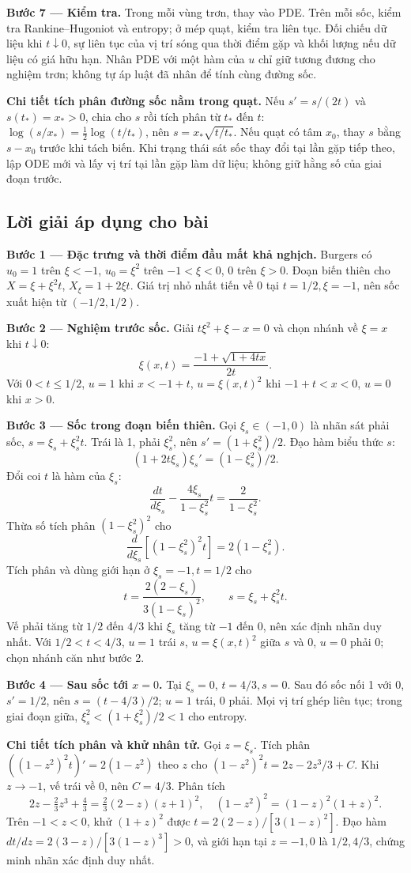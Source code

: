 \documentclass[10pt,a4paper]{article}
\begin{document}
\textbf{Bước 7 — Kiểm tra.} Trong mỗi vùng trơn, thay vào PDE. Trên mỗi sốc, kiểm tra Rankine–Hugoniot và entropy; ở mép quạt, kiểm tra liên tục. Đối chiếu dữ liệu khi $t\downarrow0$, sự liên tục của vị trí sóng qua thời điểm gặp và khối lượng nếu dữ liệu có giá hữu hạn. Nhân PDE với một hàm của $u$ chỉ giữ tương đương cho nghiệm trơn; không tự áp luật đã nhân để tính cùng đường sốc.

\textbf{Chi tiết tích phân đường sốc nằm trong quạt.} Nếu $s'=s/(2t)$ và $s(t_*)=x_*>0$, chia cho $s$ rồi tích phân từ $t_*$ đến $t$: $\log(s/x_*)=\frac12\log(t/t_*)$, nên $s=x_*\sqrt{t/t_*}$. Nếu quạt có tâm $x_0$, thay $s$ bằng $s-x_0$ trước khi tách biến. Khi trạng thái sát sốc thay đổi tại lần gặp tiếp theo, lập ODE mới và lấy vị trí tại lần gặp làm dữ liệu; không giữ hằng số của giai đoạn trước.
\subsection*{Lời giải áp dụng cho bài}
\textbf{Bước 1 — Đặc trưng và thời điểm đầu mất khả nghịch.} Burgers có $u_0=1$ trên $\xi<-1$, $u_0=\xi^2$ trên $-1<\xi<0$, 0 trên $\xi>0$. Đoạn biến thiên cho $X=\xi+\xi^2t$, $X_\xi=1+2\xi t$. Giá trị nhỏ nhất tiến về 0 tại $t=1/2,\xi=-1$, nên sốc xuất hiện từ $(-1/2,1/2)$.

\textbf{Bước 2 — Nghiệm trước sốc.} Giải $t\xi^2+\xi-x=0$ và chọn nhánh về $\xi=x$ khi $t\downarrow0$:
\[\xi(x,t)=\frac{-1+\sqrt{1+4tx}}{2t}.\]
Với $0<t\le1/2$, $u=1$ khi $x<-1+t$, $u=\xi(x,t)^2$ khi $-1+t<x<0$, $u=0$ khi $x>0$.

\textbf{Bước 3 — Sốc trong đoạn biến thiên.} Gọi $\xi_s\in(-1,0)$ là nhãn sát phải sốc, $s=\xi_s+\xi_s^2t$. Trái là 1, phải $\xi_s^2$, nên $s'=(1+\xi_s^2)/2$. Đạo hàm biểu thức $s$:
\[(1+2t\xi_s)\xi_s'=(1-\xi_s^2)/2.\]
Đổi coi $t$ là hàm của $\xi_s$:
\[\frac{dt}{d\xi_s}-\frac{4\xi_s}{1-\xi_s^2}t=\frac2{1-\xi_s^2}.\]
Thừa số tích phân $(1-\xi_s^2)^2$ cho
\[\frac{d}{d\xi_s}[(1-\xi_s^2)^2t]=2(1-\xi_s^2).\]
Tích phân và dùng giới hạn ở $\xi_s=-1,t=1/2$ cho
\[t=\frac{2(2-\xi_s)}{3(1-\xi_s)^2},\qquad s=\xi_s+\xi_s^2t.\]
Vế phải tăng từ $1/2$ đến $4/3$ khi $\xi_s$ tăng từ $-1$ đến 0, nên xác định nhãn duy nhất. Với $1/2<t<4/3$, $u=1$ trái $s$, $u=\xi(x,t)^2$ giữa $s$ và 0, $u=0$ phải 0; chọn nhánh căn như bước 2.

\textbf{Bước 4 — Sau sốc tới $x=0$.} Tại $\xi_s=0$, $t=4/3,s=0$. Sau đó sốc nối 1 với 0, $s' =1/2$, nên $s=(t-4/3)/2$; $u=1$ trái, 0 phải. Mọi vị trí ghép liên tục; trong giai đoạn giữa, $\xi_s^2<(1+\xi_s^2)/2<1$ cho entropy.

\textbf{Chi tiết tích phân và khử nhân tử.} Gọi $z=\xi_s$. Tích phân $( (1-z^2)^2t)'=2(1-z^2)$ theo $z$ cho $(1-z^2)^2t=2z-2z^3/3+C$. Khi $z\to-1$, vế trái về $0$, nên $C=4/3$. Phân tích
\[2z-\tfrac23z^3+\tfrac43=\tfrac23(2-z)(z+1)^2,\quad
(1-z^2)^2=(1-z)^2(1+z)^2.\]
Trên $-1<z<0$, khử $(1+z)^2$ được $t=2(2-z)/[3(1-z)^2]$. Đạo hàm $dt/dz=2(3-z)/[3(1-z)^3]>0$, và giới hạn tại $z=-1,0$ là $1/2,4/3$, chứng minh nhãn xác định duy nhất.
\end{document}
